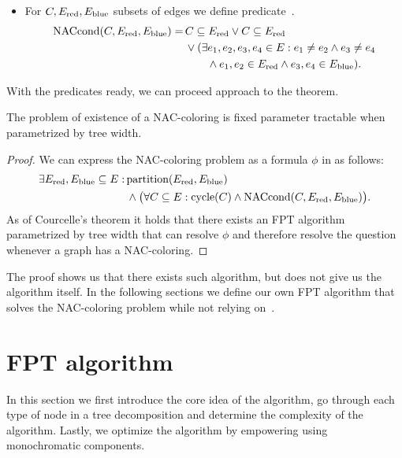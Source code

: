 \begin{itemize}
	\item For \( C, E_{\text{red}}, E_{\text{blue}} \) subsets of edges we define predicate~\cite{my_paper}.
	      \begin{align}
		      \text{NACcond}(C, E_{\text{red}}, E_{\text{blue}}) = \,
		       & C \subseteq E_{\text{red}} \lor C \subseteq E_{\text{red}}
		      \notag                                                          \\
		       & \lor (\exists e_1, e_2, e_3, e_4 \in E :
		      e_1 \ne e_2 \land e_3 \ne e_4
		      \notag                                                          \\
		       & \qquad \land e_1, e_2 \in E_{\text{red}} \land e_3, e_4 \in E_{\text{blue}} )
		      . \notag
	      \end{align}
\end{itemize}

With the predicates ready, we can proceed approach to the theorem.
%
\begin{theorem}
	The problem of existence of a NAC-coloring is fixed parameter
	tractable when parametrized by tree width.
\end{theorem}
%
\begin{proof}
	We can express the NAC-coloring problem
	as a formula \( \phi \) in \MSO{} as follows:
	\begin{align}
		\exists E_{\text{red}}, E_{\text{blue}} \subseteq E : \,
		 & \text{partition}(E_{\text{red}}, E_{\text{blue}}) \notag                                                          \\
		 & \land \big(\forall C \subseteq E : \text{cycle}(C) \land \text{NACcond}(C, E_{\text{red}}, E_{\text{blue}}) \big)
		. \notag
	\end{align}
	As of Courcelle's theorem 
	it holds that there exists an FPT algorithm parametrized by tree width
	that can resolve \( \phi \) and therefore resolve the question whenever a graph has a NAC-coloring.
\end{proof}
%
The proof shows us that there exists such algorithm,
but does not give us the algorithm itself.
In the following sections we define our
own FPT algorithm that solves the NAC-coloring problem
while not relying on~\MSO{}.

\section{FPT algorithm}

In this section we first introduce the core idea of the algorithm,
go through each type of node in a tree decomposition and
determine the complexity of the algorithm.
Lastly, we optimize the algorithm by empowering using monochromatic components.


